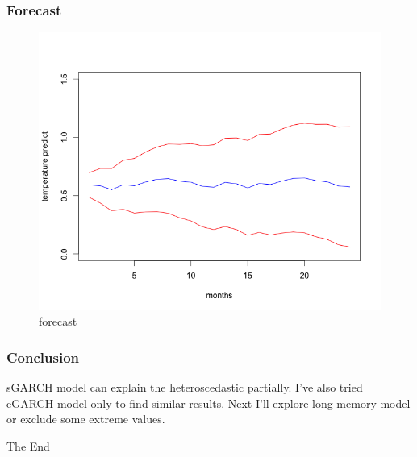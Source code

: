 \documentclass[9pt]{beamer}
\begin{document}
\begin{frame}[fragile]
\frametitle{Forecast}
\begin{figure}[H]
\centering
\caption{forecast}
\includegraphics[scale=.40]{predict01.png}
\end{figure}
\end{frame}


\begin{frame}
\frametitle{Conclusion}
sGARCH model can explain the heteroscedastic partially. I've also tried eGARCH model only to find similar results. Next I'll explore long memory model or exclude some extreme values. 
\end{frame}

\begin{frame}

\Huge{\centerline{The End}}

\end{frame}

\end{document}
